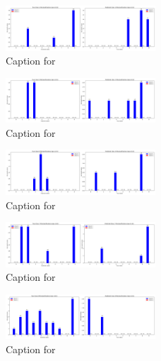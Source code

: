 \documentclass[12pt, a4paper]{article}
\begin{document}
\begin{figure}[ht]
\centering
\includegraphics[width=0.5\textwidth]{combined_class_boundary_pgd/combined_class_4_misclassifications_eps_0.01.png}
\caption{Caption for }
\label{fig:combined_class_4_misclassifications_eps_0.01.png}
\end{figure}

\begin{figure}[ht]
\centering
\includegraphics[width=0.5\textwidth]{combined_class_boundary_pgd/combined_class_5_misclassifications_eps_0.01.png}
\caption{Caption for }
\label{fig:combined_class_5_misclassifications_eps_0.01.png}
\end{figure}

\begin{figure}[ht]
\centering
\includegraphics[width=0.5\textwidth]{combined_class_boundary_pgd/combined_class_6_misclassifications_eps_0.01.png}
\caption{Caption for }
\label{fig:combined_class_6_misclassifications_eps_0.01.png}
\end{figure}

\begin{figure}[ht]
\centering
\includegraphics[width=0.5\textwidth]{combined_class_boundary_pgd/combined_class_7_misclassifications_eps_0.01.png}
\caption{Caption for }
\label{fig:combined_class_7_misclassifications_eps_0.01.png}
\end{figure}

\begin{figure}[ht]
\centering
\includegraphics[width=0.5\textwidth]{combined_class_boundary_pgd/combined_class_8_misclassifications_eps_0.01.png}
\caption{Caption for }
\label{fig:combined_class_8_misclassifications_eps_0.01.png}
\end{figure}
\end{document}
